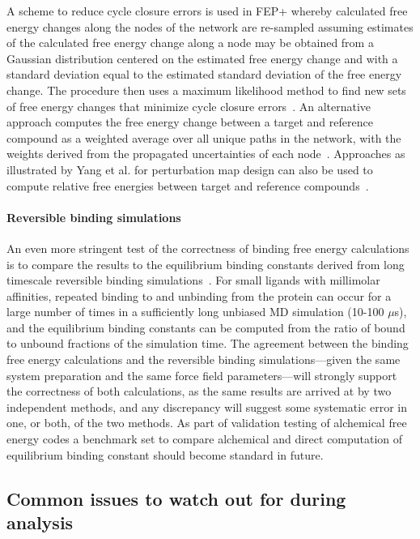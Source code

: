 \documentclass[9pt,bestpractices]{livecoms}
\begin{document}
A scheme to reduce cycle closure errors is used in FEP+ whereby calculated free energy changes along the nodes of the network are re-sampled assuming estimates of the calculated free energy change along a node may be obtained from a Gaussian distribution centered on the estimated free energy change and with a standard deviation equal to the estimated standard deviation of the free energy change. The procedure then uses a maximum likelihood method to find new sets of free energy changes that minimize cycle closure errors~\cite{wang2013modeling}. An alternative approach computes the free energy change between a target and reference compound as a weighted average over all unique paths in the network, with the weights derived from the propagated uncertainties of each node~\cite{mey2016blinded}. Approaches as illustrated by Yang et al. for perturbation map design can also be used to compute relative free energies between target and reference compounds~\cite{yang2020optimal}.

\paragraph{Reversible binding simulations}
An even more stringent test of the correctness of binding free energy calculations is to compare the results to the equilibrium binding constants derived from long timescale reversible binding simulations~\cite{pan2017quantitative}. For small ligands with millimolar affinities, repeated binding to and unbinding from the protein can occur for a large number of times in a sufficiently long unbiased MD simulation (10-100 $\mu$s), and the equilibrium binding constants can be computed from the ratio of bound to unbound fractions of the simulation time. The agreement between the binding free energy calculations and the reversible binding simulations---given the same system preparation and the same force field parameters---will strongly support the correctness of both calculations, as the same results are arrived at by two independent methods, and any discrepancy will suggest some systematic error in one, or both, of the two methods. As part of validation testing of alchemical free energy codes a benchmark set to compare alchemical and direct computation of equilibrium binding constant should become standard in future.

\subsection{Common issues to watch out for during analysis}
\end{document}
